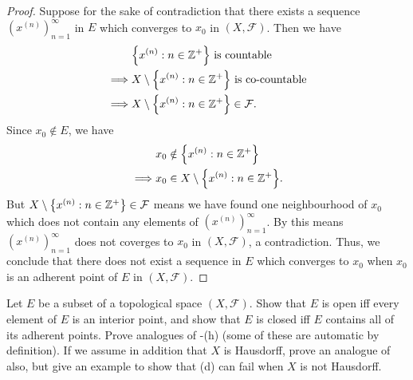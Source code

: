 \begin{proof}
  Suppose for the sake of contradiction that there exists a sequence \((x^{(n)})_{n = 1}^\infty\) in \(E\) which converges to \(x_0\) in \((X, \mathcal{F})\).
  Then we have
  \begin{align*}
             & \set{x^{(n)} : n \in \Z^+} \text{ is countable}                \\
    \implies & X \setminus \set{x^{(n)} : n \in \Z^+} \text{ is co-countable} \\
    \implies & X \setminus \set{x^{(n)} : n \in \Z^+} \in \mathcal{F}.
  \end{align*}
  Since \(x_0 \notin E\), we have
  \begin{align*}
             & x_0 \notin \set{x^{(n)} : n \in \Z^+}           \\
    \implies & x_0 \in X \setminus \set{x^{(n)} : n \in \Z^+}.
  \end{align*}
  But \(X \setminus \left\lbrace x^{(n)} : n \in \mathbb{Z}^+\right\rbrace \in \mathcal{F}\) means we have found one neighbourhood of \(x_0\) which does not contain any elements of \((x^{(n)})_{n = 1}^\infty\).
  By  this means \((x^{(n)})_{n = 1}^\infty\) does not coverges to \(x_0\) in \((X, \mathcal{F})\), a contradiction.
  Thus, we conclude that there does not exist a sequence in \(E\) which converges to \(x_0\) when \(x_0\) is an adherent point of \(E\) in \((X, \mathcal{F})\).
\end{proof}

\begin{ex}\label{ii:ex:2.5.11}
  Let \(E\) be a subset of a topological space \((X, \mathcal{F})\).
  Show that \(E\) is open iff every element of \(E\) is an interior point, and show that \(E\) is closed iff \(E\) contains all of its adherent points.
  Prove analogues of -(h) (some of these are automatic by definition).
  If we assume in addition that \(X\) is Hausdorff, prove an analogue of  also, but give an example to show that (d) can fail when \(X\) is not Hausdorff.
\end{ex}

